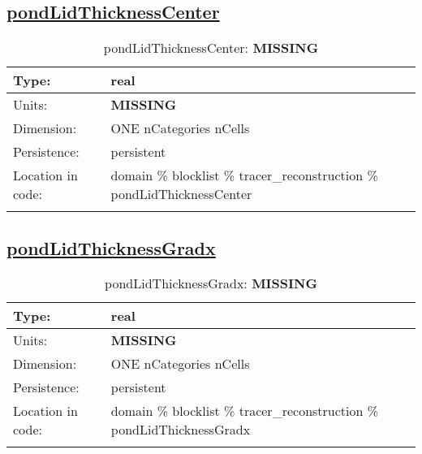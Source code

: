 \subsection[pondLidThicknessCenter]{\hyperref[sec:var_tab_tracer_reconstruction]{pondLidThicknessCenter}}
\label{subsec:var_sec_tracer_reconstruction_pondLidThicknessCenter}
\begin{center}
\begin{longtable}{| p{2.0in} | p{4.0in} |}
        \hline 
        Type: & real \\
        \hline 
        Units: & {\bf \color{red} MISSING} \\
        \hline 
        Dimension: & ONE nCategories nCells \\
        \hline 
        Persistence: & persistent \\
        \hline 
         Location in code: & domain \% blocklist \% tracer\_reconstruction \% pondLidThicknessCenter \\
         \hline 
    \caption{pondLidThicknessCenter: {\bf \color{red} MISSING}}
\end{longtable}
\end{center}
\subsection[pondLidThicknessGradx]{\hyperref[sec:var_tab_tracer_reconstruction]{pondLidThicknessGradx}}
\label{subsec:var_sec_tracer_reconstruction_pondLidThicknessGradx}
\begin{center}
\begin{longtable}{| p{2.0in} | p{4.0in} |}
        \hline 
        Type: & real \\
        \hline 
        Units: & {\bf \color{red} MISSING} \\
        \hline 
        Dimension: & ONE nCategories nCells \\
        \hline 
        Persistence: & persistent \\
        \hline 
         Location in code: & domain \% blocklist \% tracer\_reconstruction \% pondLidThicknessGradx \\
         \hline 
    \caption{pondLidThicknessGradx: {\bf \color{red} MISSING}}
\end{longtable}
\end{center}
